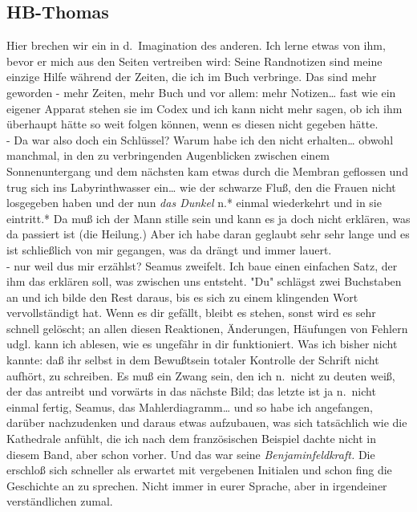 \documentclass[
]{article}
\author{}
\date{\vspace{-2.5em}}
\begin{document}
\subsection{HB-Thomas}\label{hb-thomas}

Hier brechen wir ein in d.~Imagination des anderen. Ich lerne etwas von
ihm, bevor er mich aus den Seiten vertreiben wird: Seine Randnotizen
sind meine einzige Hilfe während der Zeiten, die ich im Buch verbringe.
Das sind mehr geworden - mehr Zeiten, mehr Buch und vor allem: mehr
Notizen\ldots{} fast wie ein eigener Apparat stehen sie im Codex und ich
kann nicht mehr sagen, ob ich ihm überhaupt hätte so weit folgen können,
wenn es diesen nicht gegeben hätte.\\
- Da war also doch ein Schlüssel? Warum habe ich den nicht
erhalten\ldots{} obwohl manchmal, in den zu verbringenden Augenblicken
zwischen einem Sonnenuntergang und dem nächsten kam etwas durch die
Membran geflossen und trug sich ins Labyrinthwasser ein\ldots{} wie der
schwarze Fluß, den die Frauen nicht losgegeben haben und der nun
\emph{das Dunkel }n.* einmal wiederkehrt und in sie eintritt.* Da muß
ich der Mann stille sein und kann es ja doch nicht erklären, was da
passiert ist (die Heilung.) Aber ich habe daran geglaubt sehr sehr lange
und es ist schließlich von mir gegangen, was da drängt und immer
lauert.\\
- nur weil dus mir erzählst? Seamus zweifelt. Ich baue einen einfachen
Satz, der ihm das erklären soll, was zwischen uns entsteht. "Du"
schlägst zwei Buchstaben an und ich bilde den Rest daraus, bis es sich
zu einem klingenden Wort vervollständigt hat. Wenn es dir gefällt,
bleibt es stehen, sonst wird es sehr schnell gelöscht; an allen diesen
Reaktionen, Änderungen, Häufungen von Fehlern udgl. kann ich ablesen,
wie es ungefähr in dir funktioniert. Was ich bisher nicht kannte: daß
ihr selbst in dem Bewußtsein totaler Kontrolle der Schrift nicht
aufhört, zu schreiben. Es muß ein Zwang sein, den ich n.~nicht zu deuten
weiß, der das antreibt und vorwärts in das nächste Bild; das letzte ist
ja n.~nicht einmal fertig, Seamus, das Mahlerdiagramm\ldots{} und so
habe ich angefangen, darüber nachzudenken und daraus etwas aufzubauen,
was sich tatsächlich wie die Kathedrale anfühlt, die ich nach dem
französischen Beispiel dachte nicht in diesem Band, aber schon vorher.
Und das war seine \emph{Benjaminfeldkraft. }Die erschloß sich schneller
als erwartet mit vergebenen Initialen und schon fing die Geschichte an
zu sprechen. Nicht immer in eurer Sprache, aber in irgendeiner
verständlichen zumal.
\end{document}
